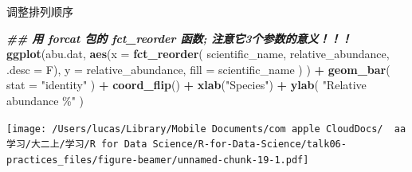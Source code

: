 \documentclass[ignorenonframetext,]{beamer}
\newenvironment{Shaded}{\begin{snugshade}}{\end{snugshade}}
\newcommand{\AttributeTok}[1]{\textcolor[rgb]{0.13,0.29,0.53}{#1}}
\newcommand{\DocumentationTok}[1]{\textcolor[rgb]{0.56,0.35,0.01}{\textbf{\textit{#1}}}}
\newcommand{\FunctionTok}[1]{\textcolor[rgb]{0.13,0.29,0.53}{\textbf{#1}}}
\newcommand{\NormalTok}[1]{#1}
\newcommand{\SpecialCharTok}[1]{\textcolor[rgb]{0.81,0.36,0.00}{\textbf{#1}}}
\newcommand{\StringTok}[1]{\textcolor[rgb]{0.31,0.60,0.02}{#1}}
\newcommand\FontSmall{\fontsize{7}{8}\selectfont}
\begin{document}
\begin{frame}[fragile]{调整排列顺序}
\protect\hypertarget{ux8c03ux6574ux6392ux5217ux987aux5e8f}{}
\FontSmall

\begin{Shaded}
\begin{Highlighting}[]
\DocumentationTok{\#\# 用 forcat 包的 fct\_reorder 函数; 注意它3个参数的意义！！！}
\FunctionTok{ggplot}\NormalTok{(abu.dat, }\FunctionTok{aes}\NormalTok{(}\AttributeTok{x =} \FunctionTok{fct\_reorder}\NormalTok{( scientific\_name, relative\_abundance, }\AttributeTok{.desc =}\NormalTok{ F), }
                    \AttributeTok{y =}\NormalTok{ relative\_abundance, }\AttributeTok{fill =}\NormalTok{ scientific\_name ) ) }\SpecialCharTok{+} 
  \FunctionTok{geom\_bar}\NormalTok{( }\AttributeTok{stat =} \StringTok{"identity"}\NormalTok{ ) }\SpecialCharTok{+} 
  \FunctionTok{coord\_flip}\NormalTok{() }\SpecialCharTok{+} \FunctionTok{xlab}\NormalTok{(}\StringTok{"Species"}\NormalTok{) }\SpecialCharTok{+} \FunctionTok{ylab}\NormalTok{( }\StringTok{"Relative abundance \%"}\NormalTok{ ) }
\end{Highlighting}
\end{Shaded}

\texttt{[image: /Users/lucas/Library/Mobile Documents/com~apple~CloudDocs/~~aa学习/大二上/学习/R for Data Science/R-for-Data-Science/talk06-practices\_files/figure-beamer/unnamed-chunk-19-1.pdf]}
\end{frame}
\end{document}
